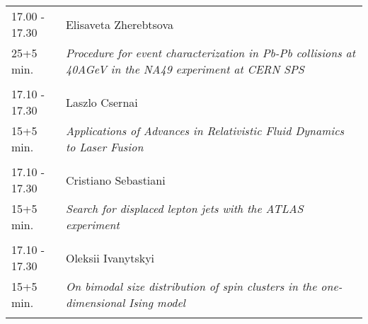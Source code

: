 \begin{longtable}{p{3cm}p{13cm}}
17.00 - 17.30 & Elisaveta Zherebtsova\\ 
25+5 min. & {\it Procedure for event characterization in Pb-Pb collisions at 40AGeV in the NA49 experiment at CERN SPS}\\ 
 & \\ 
17.10 - 17.30 & Laszlo Csernai\\ 
15+5 min. & {\it Applications of Advances in Relativistic Fluid Dynamics to Laser Fusion}\\ 
 & \\ 
17.10 - 17.30 & Cristiano Sebastiani\\ 
15+5 min. & {\it Search for displaced lepton jets with the ATLAS experiment}\\ 
 & \\ 
17.10 - 17.30 & Oleksii Ivanytskyi\\ 
15+5 min. & {\it On bimodal size distribution of spin clusters in the one-dimensional Ising model}\\ 
 & \\ 
\end{longtable}

